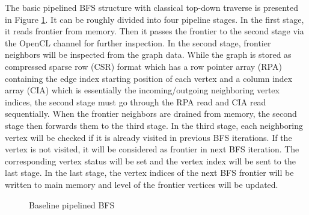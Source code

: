 The basic pipelined BFS structure with classical top-down traverse 
is presented in Figure \ref{fig:base-bfs}. It can be roughly 
divided into four pipeline stages. In the first stage, it reads 
frontier from memory. Then it passes the frontier to the second stage
via the OpenCL channel for further inspection. In the second stage, 
frontier neighbors will be inspected from the graph data. While the 
graph is stored as compressed sparse row (CSR) format which has a row 
pointer array (RPA) containing the edge index starting position of each 
vertex and a column index array (CIA) which is essentially the incoming/outgoing 
neighboring vertex indices, the second stage must go through the RPA read and 
CIA read sequentially. When the frontier neighbors are 
drained from memory, the second stage then forwards them to the third stage.
In the third stage, each neighboring vertex will be checked if it is 
already visited in previous BFS iterations. If the vertex is not visited, 
it will be considered as frontier in next BFS iteration. The corresponding 
vertex status will be set and the vertex index will be sent to the last stage.
In the last stage, the vertex indices of the next BFS frontier will be 
written to main memory and level of the frontier vertices will be updated.

\begin{figure}
    \caption{Baseline pipelined BFS}
\label{fig:base-bfs}
\vspace{-1em}
\end{figure}



